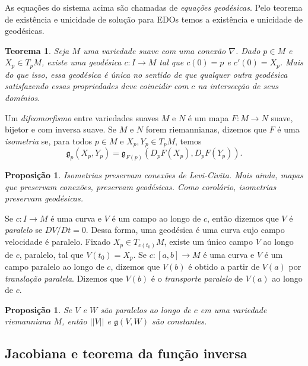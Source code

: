 \documentclass{article}
\newtheorem{proposition}[definition]{Proposição}
\newtheorem{theorem}[definition]{Teorema}
\begin{document}
As equações do sistema acima são chamadas de \textit{equações geodésicas}. Pelo teorema de existência e unicidade de solução para EDOs temos a existência e unicidade de geodésicas.

\begin{theorem}\label{geodesicas_existencia}
    Seja $M$ uma variedade suave com uma conexão $\nabla$. Dado $p \in M$ e $X_p \in T_pM$, existe uma geodésica $c \colon I \to M$ tal que $c(0) = p$ e $c'(0) = X_p$. Mais do que isso, essa geodésica é única no sentido de que qualquer outra geodésica satisfazendo essas propriedades deve coincidir com $c$ na intersecção de seus domínios.
\end{theorem}

Um \textit{difeomorfismo} entre variedades suaves $M$ e $N$ é um mapa $F \colon M \to N$ suave, bijetor e com inversa suave. Se $M$ e $N$ forem riemannianas, dizemos que $F$ é uma \textit{isometria} se, para todos $p \in M$ e $X_p, Y_p \in T_pM$, temos \begin{equation}
    \mathfrak{g}_p(X_p, Y_p) = \mathfrak{g}_{F(p)}(D_pF(X_p), D_pF(Y_p)).
\end{equation}

\begin{proposition}
    Isometrias preservam conexões de Levi-Civita. Mais ainda, mapas que preservam conexões, preservam geodésicas. Como corolário, isometrias preservam geodésicas.
\end{proposition}

Se $c \colon I \to M$ é uma curva e $V$ é um campo ao longo de $c$, então dizemos que $V$ é \textit{paralelo} se $DV/Dt = 0$. Dessa forma, uma geodésica é uma curva cujo campo velocidade é paralelo. Fixado $X_p \in T_{c(t_0)}M$, existe um único campo $V$ ao longo de $c$, paralelo, tal que $V(t_0) = X_p$. Se $c \colon [a,b] \to M$ é uma curva e $V$ é um campo paralelo ao longo de $c$, dizemos que $V(b)$ é obtido a partir de $V(a)$ por \textit{translação paralela}. Dizemos que $V(b)$ é o \textit{transporte paralelo} de $V(a)$ ao longo de $c$.

\begin{proposition}
    Se $V$ e $W$ são paralelos ao longo de $c$ em uma variedade riemanniana $M$, então $||V||$ e $\mathfrak{g}(V, W)$ são constantes.
\end{proposition}

\subsection{Jacobiana e teorema da função inversa}
\end{document}
